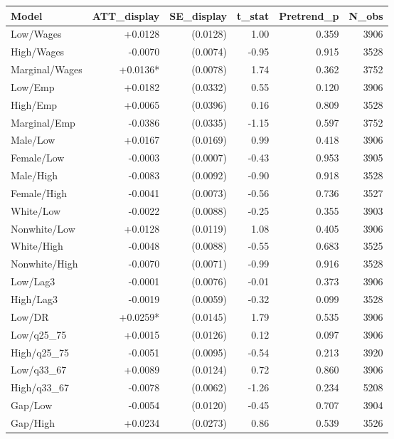 \begin{table}[ht]
\centering
\begin{tabular}{lrrrrr}
  \toprule
Model & ATT_display & SE_display & t_stat & Pretrend_p & N_obs \\ 
  \midrule
Low/Wages & +0.0128 & (0.0128) & 1.00 & 0.359 & 3906 \\ 
  High/Wages & -0.0070 & (0.0074) & -0.95 & 0.915 & 3528 \\ 
  Marginal/Wages & +0.0136* & (0.0078) & 1.74 & 0.362 & 3752 \\ 
  Low/Emp & +0.0182 & (0.0332) & 0.55 & 0.120 & 3906 \\ 
  High/Emp & +0.0065 & (0.0396) & 0.16 & 0.809 & 3528 \\ 
  Marginal/Emp & -0.0386 & (0.0335) & -1.15 & 0.597 & 3752 \\ 
  Male/Low & +0.0167 & (0.0169) & 0.99 & 0.418 & 3906 \\ 
  Female/Low & -0.0003 & (0.0007) & -0.43 & 0.953 & 3905 \\ 
  Male/High & -0.0083 & (0.0092) & -0.90 & 0.918 & 3528 \\ 
  Female/High & -0.0041 & (0.0073) & -0.56 & 0.736 & 3527 \\ 
  White/Low & -0.0022 & (0.0088) & -0.25 & 0.355 & 3903 \\ 
  Nonwhite/Low & +0.0128 & (0.0119) & 1.08 & 0.405 & 3906 \\ 
  White/High & -0.0048 & (0.0088) & -0.55 & 0.683 & 3525 \\ 
  Nonwhite/High & -0.0070 & (0.0071) & -0.99 & 0.916 & 3528 \\ 
  Low/Lag3 & -0.0001 & (0.0076) & -0.01 & 0.373 & 3906 \\ 
  High/Lag3 & -0.0019 & (0.0059) & -0.32 & 0.099 & 3528 \\ 
  Low/DR & +0.0259* & (0.0145) & 1.79 & 0.535 & 3906 \\ 
  Low/q25_75 & +0.0015 & (0.0126) & 0.12 & 0.097 & 3906 \\ 
  High/q25_75 & -0.0051 & (0.0095) & -0.54 & 0.213 & 3920 \\ 
  Low/q33_67 & +0.0089 & (0.0124) & 0.72 & 0.860 & 3906 \\ 
  High/q33_67 & -0.0078 & (0.0062) & -1.26 & 0.234 & 5208 \\ 
  Gap/Low & -0.0054 & (0.0120) & -0.45 & 0.707 & 3904 \\ 
  Gap/High & +0.0234 & (0.0273) & 0.86 & 0.539 & 3526 \\ 

\end{tabular}
\end{table}
